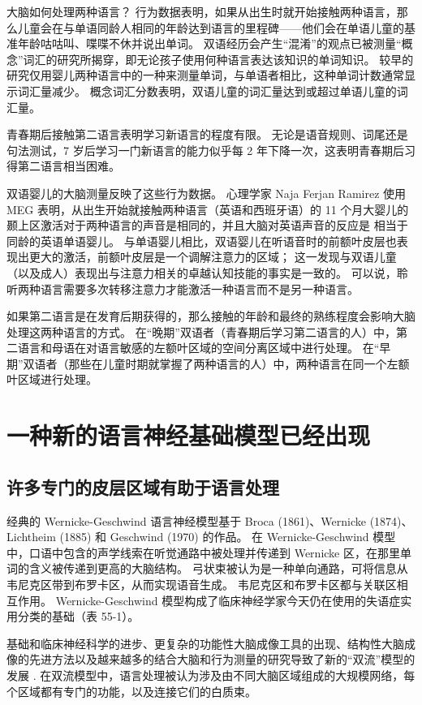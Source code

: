 大脑如何处理两种语言？ 行为数据表明，如果从出生时就开始接触两种语言，那么儿童会在与单语同龄人相同的年龄达到语言的里程碑——他们会在单语儿童的基准年龄咕咕叫、喋喋不休并说出单词。 双语经历会产生“混淆”的观点已被测量“概念”词汇的研究所揭穿，即无论孩子使用何种语言表达该知识的单词知识。 较早的研究仅用婴儿两种语言中的一种来测量单词，与单语者相比，这种单词计数通常显示词汇量减少。 概念词汇分数表明，双语儿童的词汇量达到或超过单语儿童的词汇量。

青春期后接触第二语言表明学习新语言的程度有限。 无论是语音规则、词尾还是句法测试，7 岁后学习一门新语言的能力似乎每 2 年下降一次，这表明青春期后习得第二语言相当困难。

双语婴儿的大脑测量反映了这些行为数据。 心理学家 Naja Ferjan Ramirez 使用 MEG 表明，从出生开始就接触两种语言（英语和西班牙语）的 11 个月大婴儿的颞上区激活对于两种语言的声音是相同的，并且大脑对英语声音的反应是 相当于同龄的英语单语婴儿。 与单语婴儿相比，双语婴儿在听语音时的前额叶皮层也表现出更大的激活，前额叶皮层是一个调解注意力的区域； 这一发现与双语儿童（以及成人）表现出与注意力相关的卓越认知技能的事实是一致的。 可以说，聆听两种语言需要多次转移注意力才能激活一种语言而不是另一种语言。

如果第二语言是在发育后期获得的，那么接触的年龄和最终的熟练程度会影响大脑处理这两种语言的方式。 在“晚期”双语者（青春期后学习第二语言的人）中，第二语言和母语在对语言敏感的左额叶区域的空间分离区域中进行处理。 在“早期”双语者（那些在儿童时期就掌握了两种语言的人）中，两种语言在同一个左额叶区域进行处理。


\section{一种新的语言神经基础模型已经出现}
\subsection{许多专门的皮层区域有助于语言处理}
经典的 Wernicke-Geschwind 语言神经模型基于 Broca (1861)、Wernicke (1874)、Lichtheim (1885) 和 Geschwind (1970) 的作品。 在 Wernicke-Geschwind 模型中，口语中包含的声学线索在听觉通路中被处理并传递到 Wernicke 区，在那里单词的含义被传递到更高的大脑结构。 弓状束被认为是一种单向通路，可将信息从韦尼克区带到布罗卡区，从而实现语音生成。 韦尼克区和布罗卡区都与关联区相互作用。 Wernicke-Geschwind 模型构成了临床神经学家今天仍在使用的失语症实用分类的基础（表 55-1）。

基础和临床神经科学的进步、更复杂的功能性大脑成像工具的出现、结构性大脑成像的先进方法以及越来越多的结合大脑和行为测量的研究导致了新的“双流”模型的发展 . 在双流模型中，语言处理被认为涉及由不同大脑区域组成的大规模网络，每个区域都有专门的功能，以及连接它们的白质束。

